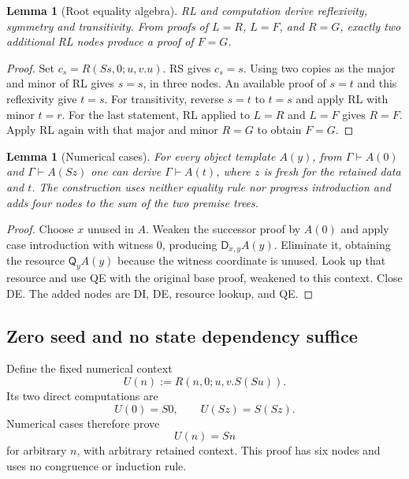 \documentclass[11pt,letterpaper]{article}
\newtheorem{lemma}[theorem]{Lemma}
\theoremstyle{definition}\newtheorem{definition}[theorem]{Definition}
\theoremstyle{remark}\newtheorem{remark}[theorem]{Remark}
\begin{document}
\begin{lemma}[Root equality algebra]\label{zcc:algebra}
RL and computation derive reflexivity, symmetry and transitivity.
From proofs of $L=R$, $L=F$, and $R=G$, exactly two additional RL nodes
produce a proof of $F=G$.
\end{lemma}
\begin{proof}
Set $c_s=R(Ss,0;u,v.u)$. RS gives $c_s=s$. Using two copies as the
major and minor of RL gives $s=s$, in three nodes. An available proof
of $s=t$ and this reflexivity give $t=s$. For transitivity, reverse
$s=t$ to $t=s$ and apply RL with minor $t=r$.
For the last statement, RL applied to $L=R$ and $L=F$ gives $R=F$.
Apply RL again with that major and minor $R=G$ to obtain $F=G$.
\end{proof}

\begin{lemma}[Numerical cases]\label{zcc:cases}
For every object template $A(y)$, from $\Gamma\vdash A(0)$ and
$\Gamma\vdash A(Sz)$ one can derive $\Gamma\vdash A(t)$, where $z$
is fresh for the retained data and $t$. The construction uses neither
equality rule nor progress introduction and adds four nodes to the
sum of the two premise trees.
\end{lemma}
\begin{proof}
Choose $x$ unused in $A$. Weaken the successor proof by $A(0)$ and apply
case introduction with witness $0$, producing $\mathsf D_{x,y}A(y)$.
Eliminate it, obtaining the resource $\mathsf Q_yA(y)$ because the
witness coordinate is unused. Look up that resource and use QE with
the original base proof, weakened to this context. Close DE. The added
nodes are DI, DE, resource lookup, and QE.
\end{proof}

\subsection{Zero seed and no state dependency suffice}

Define the fixed numerical context
\[
 U(n):=R(n,0;u,v.S(Su)).
 \label{zcc:U}
\]
Its two direct computations are
\[
 U(0)=S0,\qquad U(Sz)=S(Sz).
\]
Numerical cases therefore prove
\[
                         U(n)=Sn
 \tag{U}\label{zcc:Urep}
\]
for arbitrary $n$, with arbitrary retained context. This proof has six
nodes and uses no congruence or induction rule.
\end{document}
